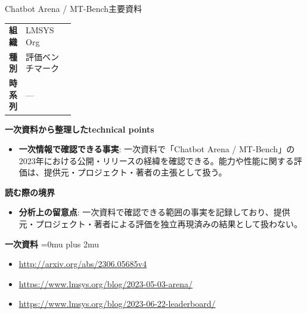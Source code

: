 \begin{technicalnote}{Chatbot Arena / MT-Bench}{主要資料}
\begingroup
\begin{tabularx}{\linewidth}{@{}>{\bfseries}p{0.22\linewidth}X@{}}
組織 & LMSYS Org \\
種別 & 評価ベンチマーク \\
時系列 & — \\
\end{tabularx}
\smallskip
{\bfseries 一次資料から整理したtechnical points}
\begin{itemize}[leftmargin=1.5em,itemsep=0.35em]
\item \textbf{一次情報で確認できる事実}: 一次資料で「Chatbot Arena / MT-Bench」の2023年における公開・リリースの経緯を確認できる。能力や性能に関する評価は、提供元・プロジェクト・著者の主張として扱う。
\end{itemize}
\begin{minipage}{\linewidth}
{\bfseries 読む際の境界}
\begin{itemize}[leftmargin=1.5em,itemsep=0.35em]
\item \textbf{分析上の留意点}: 一次資料で確認できる範囲の事実を記録しており、提供元・プロジェクト・著者による評価を独立再現済みの結果として扱わない。
\end{itemize}
\begin{samepage}
{\bfseries 一次資料}
\begingroup\sloppy
\Urlmuskip=0mu plus 2mu\relax
\begin{itemize}[leftmargin=1.5em,itemsep=0.25em]
\item {\scriptsize\url{http://arxiv.org/abs/2306.05685v4}}
\item {\scriptsize\url{https://www.lmsys.org/blog/2023-05-03-arena/}}
\item {\scriptsize\url{https://www.lmsys.org/blog/2023-06-22-leaderboard/}}
\end{itemize}
\endgroup
\end{samepage}
\end{minipage}
\endgroup
\end{technicalnote}
\medskip

